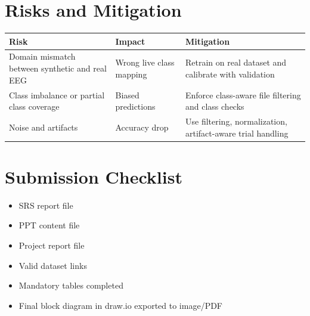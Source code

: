 \documentclass[12pt,a4paper]{article}
\begin{document}
\section{Risks and Mitigation}
\begin{longtable}{p{}p{}p{}}
\toprule
\textbf{Risk} & \textbf{Impact} & \textbf{Mitigation} \\
\midrule
Domain mismatch between synthetic and real EEG & Wrong live class mapping & Retrain on real dataset and calibrate with validation \\
Class imbalance or partial class coverage & Biased predictions & Enforce class-aware file filtering and class checks \\
Noise and artifacts & Accuracy drop & Use filtering, normalization, artifact-aware trial handling \\
\bottomrule
\end{longtable}

\section{Submission Checklist}
\begin{itemize}[leftmargin=1.5em]
  \item SRS report file
  \item PPT content file
  \item Project report file
  \item Valid dataset links
  \item Mandatory tables completed
  \item Final block diagram in draw.io exported to image/PDF
\end{itemize}
\end{document}
